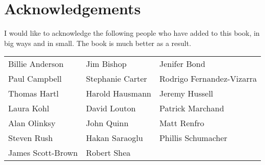 
    \chapter*{Acknowledgements}
    \thispagestyle{empty}

    I would like to acknowledge the following people who have added to this book, in big ways and in small.  The book is much better as a result. 

    \vspace{.5in}

    \begin{doublespace}
    \begin{tabular}{p{2in}p{2in}p{2in}}
    Billie Anderson&Jim Bishop&Jenifer Bond\\
Paul Campbell&Stephanie Carter&Rodrigo Fernandez-Vizarra\\
Thomas Hartl&Harold Hausmann&Jeremy Hussell\\
Laura Kohl&David Louton&Patrick Marchand\\
Alan Olinksy&John Quinn&Matt Renfro\\
Steven Rush&Hakan Saraoglu&Phillis Schumacher\\
James Scott-Brown&Robert Shea&
     \end{tabular}
    \end{doublespace}
    
